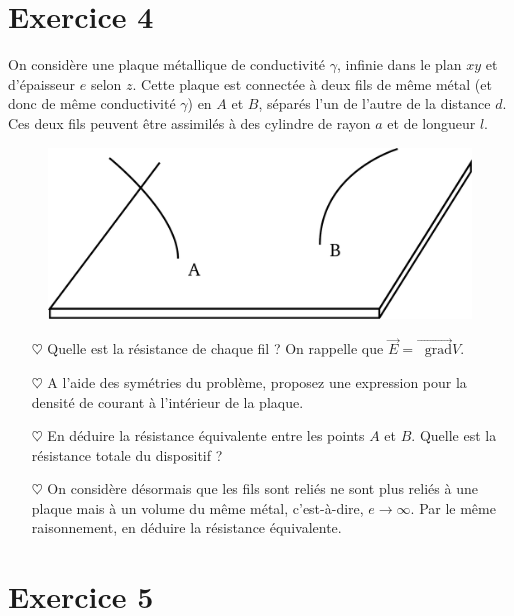 \documentclass{report}
\newcommand*\grad{\mathop{}\!\mathrm{grad}}
\begin{document}
\newpage

\section*{Exercice 4}

On considère une plaque métallique de conductivité $\gamma$, infinie dans le plan $xy$ et d'épaisseur $e$ selon $z$. Cette plaque est connectée à deux fils de même métal (et donc de même conductivité $\gamma$) en $A$ et $B$, séparés l'un de l'autre de la distance $d$. Ces deux fils peuvent être assimilés à des cylindre de rayon $a$ et de longueur $l$. 

\begin{figure}[h!]
\centering
		\includegraphics[scale=0.3]{plaque.pdf}
\end{figure}

\begin{itemize}

	\item[$\heartsuit$] Quelle est la résistance de chaque fil ? On rappelle que $\vec{E}=\vec{\grad}V$.
	
	\item[$\heartsuit$] A l'aide des symétries du problème, proposez une expression pour la densité de courant à l'intérieur de la plaque. 
	
	\item[$\heartsuit$] En déduire la résistance équivalente entre les points $A$ et $B$. Quelle est la résistance totale du dispositif ?
	
	\item[$\heartsuit$] On considère désormais que les fils sont reliés ne sont plus reliés à une plaque mais à un volume du même métal, c'est-à-dire, $e\longrightarrow\infty$. Par le même raisonnement, en déduire la résistance équivalente. 

\end{itemize}

\newpage

\section*{Exercice 5}
\end{document}
